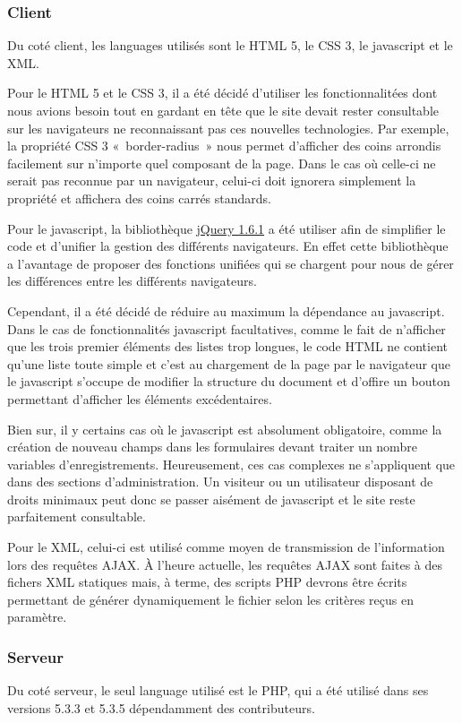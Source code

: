 \documentclass[letter, 11pt]{report}
\begin{document}
\subsubsection{Client}
Du coté client, les languages utilisés sont le HTML 5, le CSS 3, le javascript et le XML.

Pour le HTML 5 et le CSS 3, il a été décidé d'utiliser les fonctionnalitées dont nous avions besoin tout en gardant en tête que le site devait rester consultable sur les navigateurs ne reconnaissant pas ces nouvelles technologies. Par exemple, la propriété CSS 3 «~border-radius~» nous permet d'afficher des coins arrondis facilement sur n'importe quel composant de la page. Dans le cas où celle-ci ne serait pas reconnue par un navigateur, celui-ci doit ignorera simplement la propriété et affichera des coins carrés standards.

Pour le javascript, la bibliothèque \href{http://jquery.com/}{jQuery 1.6.1} a été utiliser afin de simplifier le code et d'unifier la gestion des différents navigateurs. En effet cette bibliothèque a l'avantage de proposer des fonctions unifiées qui se chargent pour nous de gérer les différences entre les différents navigateurs.

Cependant, il a été décidé de réduire au maximum la dépendance au javascript. Dans le cas de fonctionnalités javascript facultatives, comme le fait de n'afficher que les trois premier éléments des listes trop longues, le code HTML ne contient qu'une liste toute simple et c'est au chargement de la page par le navigateur que le javascript s'occupe de modifier la structure du document et d'offire un bouton permettant d'afficher les éléments excédentaires.

Bien sur, il y certains cas où le javascript est absolument obligatoire, comme la création de nouveau champs dans les formulaires devant traiter un nombre variables d'enregistrements. Heureusement, ces cas complexes ne s'appliquent que dans des sections d'administration. Un visiteur ou un utilisateur disposant de droits minimaux peut donc se passer aisément de javascript et le site reste parfaitement consultable.

Pour le XML, celui-ci est utilisé comme moyen de transmission de l'information lors des requêtes AJAX. À l'heure actuelle, les requêtes AJAX sont faites à des fichers XML statiques mais, à terme, des scripts PHP devrons être écrits permettant de générer dynamiquement le fichier selon les critères reçus en paramètre.

\subsubsection{Serveur}
Du coté serveur, le seul language utilisé est le PHP, qui a été utilisé dans ses versions 5.3.3 et 5.3.5 dépendamment des contributeurs.
\end{document}
